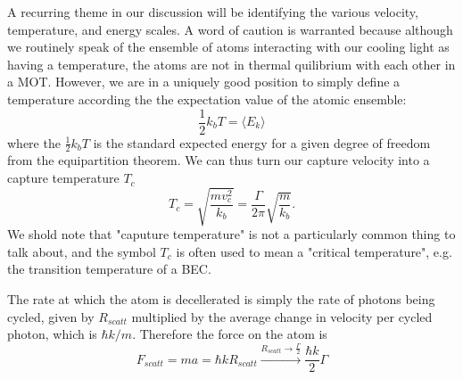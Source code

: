 \documentclass[../../main.tex]{subfiles}
\begin{document}
A recurring theme in our discussion will be identifying the various velocity, temperature, and energy scales. A word of caution is warranted because although we routinely speak of the ensemble of atoms interacting with our cooling light as having a temperature, the atoms are not in thermal quilibrium with each other in a MOT. However, we are in a uniquely good position to simply define a temperature according the the expectation value of the atomic ensemble:
\begin{equation}
    \frac12 k_bT=\langle E_k\rangle
\end{equation}
where the $\tfrac12 k_bT$ is the standard expected energy for a given degree of freedom from the equipartition theorem. We can thus turn our capture velocity into a capture temperature $T_c$ 
\begin{equation}
    T_c = \sqrt{\frac{mv_c^2}{k_b}}=\frac{\Gamma}{2\pi}\sqrt{\frac{m}{k_b}}.
\end{equation}
We shold note that "caputure temperature" is not a particularly common thing to talk about, and the symbol $T_c$ is often used to mean a "critical temperature", e.g. the transition temperature of a BEC. 

The rate at which the atom is decellerated is simply the rate of photons being cycled, given by $R_{scatt}$ multiplied by the average change in velocity per cycled photon, which is $\hbar k/m$. Therefore the force on the atom is 
\begin{equation}\label{eq. scattering force}
    F_{scatt}=ma=\hbar kR_{scatt}\xrightarrow{R_{scatt}\to \tfrac\Gamma2}\frac{\hbar k}{2}\Gamma
\end{equation}
\end{document}
